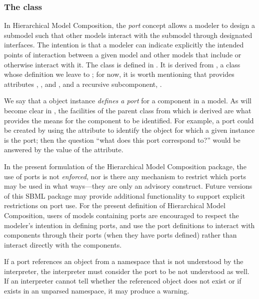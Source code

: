 \subsubsection{The  class}
\label{port-class}

In Hierarchical Model Composition, the \emph{port} concept allows a
modeler to design a submodel such that other models interact with the
submodel through designated interfaces.  The intention is that a modeler
can indicate explicitly the intended points of interaction between a
given model and other models that include or otherwise interact with it.
The \Port class is defined in .  It is derived
from \SBaseRef, a class whose definition we leave to
; for now, it is worth mentioning that \SBaseRef
provides attributes , ,  and
, and a recursive subcomponent, .

We say that a \Port object instance \emph{defines a port} for a
component in a model.  As will become clear in ,
the facilities of the \SBaseRef parent class from which \Port is derived
are what provides the means for the component to be identified.  For
example, a port could be created by using the 
attribute to identify the object for which a given \Port instance is the
port; then the question ``what does this port correspond to?'' would be
answered by the value of the  attribute.

In the present formulation of the Hierarchical Model Composition
package, the use of ports is not \emph{enforced}, nor is there any
mechanism to restrict which ports may be used in what ways---they are
only an advisory construct.  Future versions of this SBML package may
provide additional functionality to support explicit restrictions on
port use.  For the present definition of Hierarchical Model Composition,
users of models containing ports are encouraged to respect the modeler's
intention in defining ports, and use the port definitions to interact
with components through their ports (when they have ports defined)
rather than interact directly with the components.

If a port references an object from a namespace that is not understood
by the interpreter, the interpreter must consider the port to be not
understood as well.  If an interpreter cannot tell whether the
referenced object does not exist or if exists in an unparsed namespace,
it may produce a warning.


